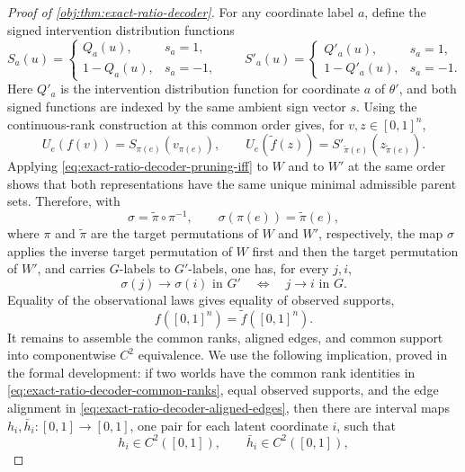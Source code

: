 \documentclass[11pt]{article}
\begin{document}
\begin{proof}[Proof of \cref{obj:thm:exact-ratio-decoder}]
For any coordinate label \(a\), define the signed intervention distribution functions
\[
S_a(u)=
\begin{cases}
Q_a(u), & s_a=1,\\
1-Q_a(u), & s_a=-1,
\end{cases}
\qquad
S'_a(u)=
\begin{cases}
Q'_a(u), & s_a=1,\\
1-Q'_a(u), & s_a=-1.
\end{cases}
\]
Here \(Q'_a\) is the intervention distribution function for coordinate \(a\) of \(\theta'\), and both signed functions are indexed by the same ambient sign vector \(s\). Using the continuous-rank construction at this common order gives, for \(v,z\in[0,1]^n\),
\begin{equation}
U_e(f(v))=S_{\pi(e)}(v_{\pi(e)}),
\qquad
U_e(\widetilde f(z))=S'_{\widetilde\pi(e)}(z_{\widetilde\pi(e)}).
\label{eq:exact-ratio-decoder-common-ranks}
\end{equation} Applying \cref{eq:exact-ratio-decoder-pruning-iff} to \(W\) and to \(W'\) at the same order shows that both representations have the same unique minimal admissible parent sets. Therefore, with
\[
\sigma=\widetilde\pi\circ\pi^{-1},
\qquad
\sigma(\pi(e))=\widetilde\pi(e),
\]
where \(\pi\) and \(\widetilde\pi\) are the target permutations of \(W\) and \(W'\), respectively, the map \(\sigma\) applies the inverse target permutation of \(W\) first and then the target permutation of \(W'\), and carries \(G\)-labels to \(G'\)-labels, one has, for every \(j,i\),
\begin{equation}
\sigma(j)\to\sigma(i)\text{ in }G'
\quad\Longleftrightarrow\quad
j\to i\text{ in }G.
\label{eq:exact-ratio-decoder-aligned-edges}
\end{equation}
Equality of the observational laws gives equality of observed supports,
\begin{equation}
f([0,1]^n)=\widetilde f([0,1]^n).
\label{eq:exact-ratio-decoder-common-support}
\end{equation}
It remains to assemble the common ranks, aligned edges, and common support into componentwise \(C^2\) equivalence. We use the following implication, proved in the formal development: if two worlds have the common rank identities in \cref{eq:exact-ratio-decoder-common-ranks}, equal observed supports, and the edge alignment in \cref{eq:exact-ratio-decoder-aligned-edges}, then there are interval maps \(h_i,\bar h_i:[0,1]\to[0,1]\), one pair for each latent coordinate \(i\), such that
\[
h_i\in C^2([0,1]),
\qquad
\bar h_i\in C^2([0,1]),
\]
\end{proof}
\end{document}
